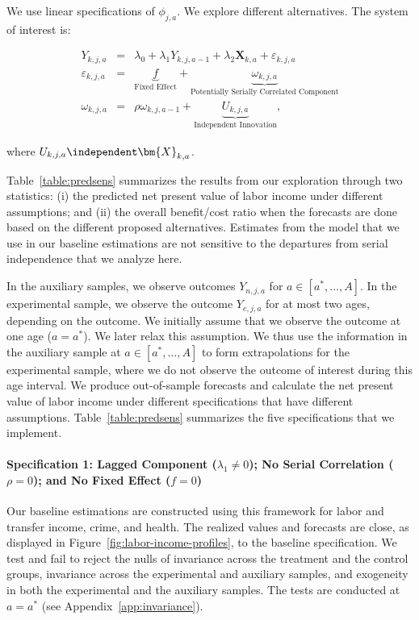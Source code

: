 We use linear specifications of $\phi_{j,a}$. We explore different alternatives. The system of interest is:

\begin{eqnarray}
Y_{k,j,a}                   &=& \lambda_{0} + \lambda_{1} Y_{k,j,a-1} + \lambda_{2}  \bm{X}_{k,a} + \varepsilon_{k,j,a} \nonumber \\
\varepsilon_{k,j,a} &=& \underbrace{f}_{\text{Fixed Effect}} + \underbrace{\omega_{k,j,a}}_{\text{Potentially Serially Correlated Component}} \nonumber \\
\omega_{k,j,a}      &=& \rho \omega_{k,j,a-1} + \underbrace{U_{k,j,a}}_{\text{Independent Innovation}},
\end{eqnarray}

\noindent where $U_{k,j,a} \independent \bm{X}_{k,a}$.

Table~\ref{table:predsens} summarizes the results from our exploration through two statistics: (i) the predicted net present value of labor income under different assumptions; and (ii) the overall benefit/cost ratio when the forecasts are done based on the different proposed alternatives. Estimates from the model that we use in our baseline estimations are not sensitive to the departures from serial independence that we analyze here.

In the auxiliary samples, we observe outcomes $Y_{n,j,a}$ for $a \in [a^*, \ldots, A]$. In the experimental sample, we observe the outcome $Y_{e,j,a}$ for at most two ages, depending on the outcome. We initially assume that we observe the outcome at one age ($a = a^*$). We later relax this assumption. We thus use the information in the auxiliary sample at  $a \in [a^*, \ldots, A]$ to form extrapolations for the experimental sample, where we do not observe the outcome of interest during this age interval. We produce out-of-sample forecasts and calculate the net present value of labor income under different specifications that have different assumptions. Table~\ref{table:predsens} summarizes the five specifications that we implement.

\paragraph{Specification 1: Lagged Component ($\lambda_{1} \neq 0$); No Serial Correlation ($\rho = 0$); and No Fixed Effect ($f = 0$)} \label{app:spec1}

Our baseline estimations are constructed using this framework for labor and transfer income, crime, and health. The realized values and forecasts are close, as displayed in Figure~\ref{fig:labor-income-profiles}, to the baseline specification. We test and fail to reject the nulls of invariance across the treatment and the control groups, invariance across the experimental and auxiliary samples, and exogeneity in both the experimental and the auxiliary samples.  The tests are conducted at $a = a^*$ (see Appendix~\ref{app:invariance}).


